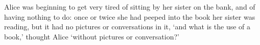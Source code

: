 \documentclass[a4paper, 12pt]{report}
\begin{document}
		\begin{shadequote}
			Alice was beginning to get very tired of sitting by her sister on the
bank, and of having nothing to do: once or twice she had peeped into the
book her sister was reading, but it had no pictures or conversations in
it, `and what is the use of a book,' thought Alice `without pictures or
conversation?'
		\end{shadequote}
		
	
\end{document}
